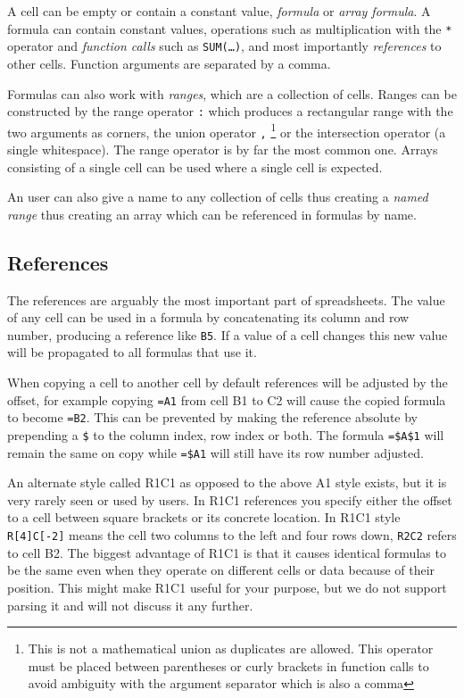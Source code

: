 \documentclass[conference]{IEEEtran}
\begin{document}
A cell can be empty or contain a constant value, \emph{formula} or \emph{array formula}.
A formula can contain constant values, operations such as multiplication with the \texttt{*} operator and \emph{function calls} such as \texttt{SUM(\ldots)}, and most importantly \emph{references} to other cells.
Function arguments are separated by a comma.

Formulas can also work with \emph{ranges}, which are a collection of cells.
Ranges can be constructed by the range operator \texttt{:} which produces a rectangular range with the two arguments as corners, the union operator \texttt{,} \footnote{This is not a mathematical union as duplicates are allowed. This operator must be placed between parentheses or curly brackets in function calls to avoid ambiguity with the argument separator which is also a comma} or the intersection operator \texttt{} (a single whitespace).
The range operator is by far the most common one.
Arrays consisting of a single cell can be used where a single cell is expected.

An user can also give a name to any collection of cells thus creating a \emph{named range} thus creating an array which can be referenced in formulas by name.

\subsection{References}
The references are arguably the most important part of spreadsheets.
The value of any cell can be used in a formula by concatenating its column and row number, producing a reference like \texttt{B5}.
If a value of a cell changes this new value will be propagated to all formulas that use it.

When copying a cell to another cell by default references will be adjusted by the offset, for example copying \texttt{=A1} from cell B1 to C2 will cause the copied formula to become \texttt{=B2}.
This can be prevented by making the reference absolute by prepending a \texttt{\$} to the column index, row index or both.
The formula \texttt{=\$A\$1} will remain the same on copy while \texttt{=\$A1} will still have its row number adjusted.

An alternate style called R1C1 as opposed to the above A1 style exists, but it is very rarely seen or used by users.
In R1C1 references you specify either the offset to a cell between square brackets or its concrete location.
In R1C1 style \texttt{R[4]C[-2]} means the cell two columns to the left and four rows down, \texttt{R2C2} refers to cell B2.
The biggest advantage of R1C1 is that it causes identical formulas to be the same even when they operate on different cells or data because of their position.
This might make R1C1 useful for your purpose, but we do not support parsing it and will not discuss it any further.
\end{document}
